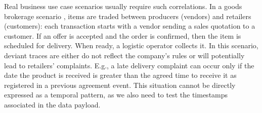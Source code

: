 Real business use case scenarios usually require such correlations. In a goods brokerage scenario \cite{PetermannJMR14},  items are traded between producers (vendors) and retailers (customers): each transaction starts with a vendor sending a sales quotation to a customer. If an offer is accepted and the order is confirmed, then the item is scheduled for delivery. When ready, a logistic operator collects it. %
In this scenario, deviant traces are %
either do not reflect the company's rules or %
will potentially lead to retailers' complaints. %
E.g., %
a late delivery complaint can occur only if the date the product is received is greater than the agreed time to receive it as registered in a previous agreement event. This situation cannot be directly expressed as a temporal pattern, as we also need to test the timestamps associated in the data payload. %



